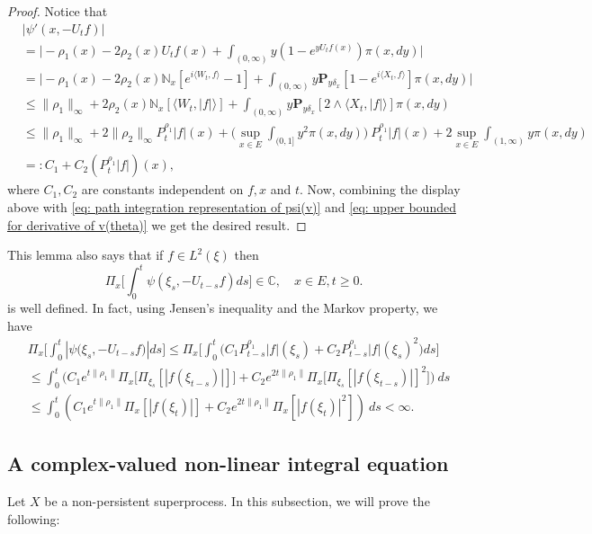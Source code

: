 \documentclass[12pt,a4paper]{amsart}
\theoremstyle{plain}
\theoremstyle{definition}
\numberwithin{equation}{section}
\begin{document}
\begin{proof}
  Notice that
  \begin{align}
    & |\psi'(x, -U_tf)| \\
    & = \Big| -\rho_1(x)- 2\rho_2(x) U_tf(x)+ \int_{(0,\infty)} y (1- e^{y U_tf(x)} ) \pi(x,dy)\Big| \\
    & = \Big| - \rho_1(x)- 2\rho_2(x)\mathbb N_x[e^{i \langle W_t, f\rangle} - 1]  + \int_{(0,\infty)} y \mathbf P_{y \delta_x}[1-e^{i \langle X_t, f\rangle}] \pi(x,dy) \Big| \\
    & \leq \|\rho_1\|_\infty + 2\rho_2(x)\mathbb N_x[\langle W_t, |f|\rangle]+ \int_{(0,\infty)} y\mathbf P_{y\delta_x}[2\wedge \langle X_t, |f|\rangle] \pi(x,dy) \\
    & \leq \|\rho_1\|_\infty + 2\|\rho_2\|_\infty P^{\rho_1}_t |f|(x) + \Big(\sup_{x\in E}\int_{(0,1]}y^2 \pi(x,dy)\Big)~P^{\rho_1}_t |f|(x) + 2\sup_{x\in E}\int_{(1,\infty)} y \pi(x,dy) \\
    & =: C_1 + C_2(P^{\rho_1}_t |f|)(x), \label{eq: upper bound of psi'(v)}
  \end{align}
  where $C_1, C_2$ are constants independent on $f,x$ and $t$.
  Now, combining the display above with \eqref{eq: path integration representation of psi(v)} and \eqref{eq: upper bounded for derivative of v(theta)} we get the desired result.
\end{proof}

This lemma also says that if $f\in L^2(\xi)$ then
\[
  \Pi_x\Big[\int_0^t \psi(\xi_s,- U_{t-s}f)ds\Big]
  \in \mathbb C,
  \quad x\in E, t\geq 0.
\]
is well defined.
In fact, using Jensen's inequality and the Markov property, we have
\begin{align}
  \label{eq: domination of psi(v)}
  & \Pi_x\Big[\int_0^t |\psi \big(\xi_s,-U_{t-s}f\big)|ds\Big]
  \leq \Pi_x\Big[\int_0^t \big(C_1 P_{t-s}^{\rho_1}|f|(\xi_s)+C_2 P_{t-s}^{\rho_1}|f|(\xi_s)^2\big)ds\Big] \\
  & \leq \int_0^t \big(C_1 e^{t\|\rho_1\|}\Pi_x \big[ \Pi_{\xi_s}[|f(\xi_{t-s})|] \big]+C_2 e^{2t\|\rho_1\|}\Pi_x \big[ \Pi_{\xi_s}[|f (\xi_{t-s})|]^2 \big]\big)~ds \\
  & \leq \int_0^t (C_1 e^{t\|\rho_1\|}\Pi_x [ |f(\xi_{t})|]+C_2e^{2t\|\rho_1\|}\Pi_x [ |f (\xi_{t})|^2 ])~ds < \infty.
\end{align}

\subsection{A complex-valued non-linear integral equation}
Let $X$ be a non-persistent superprocess.
In this subsection, we will prove the following:
\end{document}
